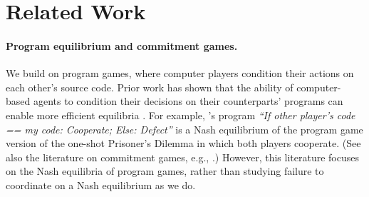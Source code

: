 \documentclass[sigconf]{aamas}
\theoremstyle{definition}
\begin{document}
\section{Related Work} 
\paragraph{Program equilibrium and commitment games.}
We 
build on  
program games,  
where computer players condition their actions
on each other's source code. 
Prior work has shown that the ability of computer-based
agents to condition their decisions on their
counterparts' programs can
enable
more efficient equilibria
\citep{mcafee,Howard1988May,rubinstein,tennenholtz2004program,lavictoire2014program,critch2019parametric,oesterheld2019robust,DiGiovanni2022Apr}. For example, 
\citet{mcafee}'s
program
\textit{``If other player's code == my code: Cooperate; Else: Defect''}
is a Nash equilibrium of the program game version of the
one-shot Prisoner's Dilemma in which both players cooperate. 
(See also the literature
on commitment games, e.g.,
\citet{kalai2010commitment,FORGES201364}.) 
However, this literature focuses on 
the Nash equilibria of program games, 
rather than studying failure to coordinate
on a Nash equilibrium as we do.
\end{document}
